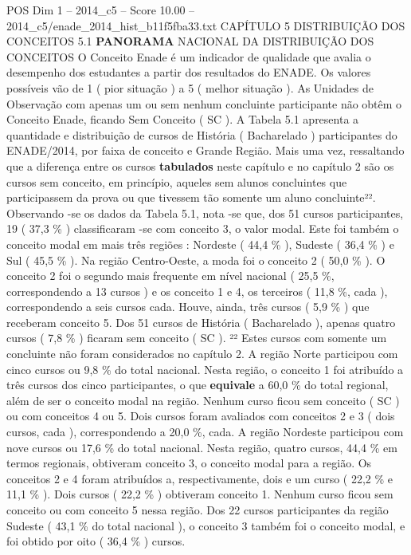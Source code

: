 \begin{textsample}{POS Dim 1 – 2014\_c5 – Score 10.00 – 2014\_c5/enade\_2014\_hist\_b11f5fba33.txt}  \label{ex:f1_pos_105}
CAPÍTULO 5 DISTRIBUIÇÃO DOS CONCEITOS 5.1 \textbf{PANORAMA} NACIONAL DA DISTRIBUIÇÃO DOS CONCEITOS O Conceito Enade é um indicador de qualidade que avalia o desempenho dos estudantes a partir dos resultados do ENADE.
Os valores possíveis vão de 1 ( pior situação ) a 5 ( melhor situação ).
As Unidades de Observação com apenas um ou sem nenhum concluinte participante não obtêm o Conceito Enade, ficando Sem Conceito ( SC ).
A Tabela 5.1 apresenta a quantidade e distribuição de cursos de História ( Bacharelado ) participantes do ENADE/2014, por faixa de conceito e Grande Região.
Mais uma vez, ressaltando que a diferença entre os cursos \textbf{tabulados} neste capítulo e no capítulo 2 são os cursos sem conceito, em princípio, aqueles sem alunos concluintes que participassem da prova ou que tivessem tão somente um aluno concluinte²².
Observando -se os dados da Tabela 5.1, nota -se que, dos 51 cursos participantes, 19 ( 37,3 \% ) classificaram -se com conceito 3, o valor modal.
Este foi também o conceito modal em mais três regiões : Nordeste ( 44,4 \% ), Sudeste ( 36,4 \% ) e Sul ( 45,5 \% ).
Na região Centro-Oeste, a moda foi o conceito 2 ( 50,0 \% ).
O conceito 2 foi o segundo mais frequente em nível nacional ( 25,5 \%, correspondendo a 13 cursos ) e os conceito 1 e 4, os terceiros ( 11,8 \%, cada ), correspondendo a seis cursos cada.
Houve, ainda, três cursos ( 5,9 \% ) que receberam conceito 5.
Dos 51 cursos de História ( Bacharelado ), apenas quatro cursos ( 7,8 \% ) ficaram sem conceito ( SC ). ²² Estes cursos com somente um concluinte não foram considerados no capítulo 2.
A região Norte participou com cinco cursos ou 9,8 \% do total nacional.
Nesta região, o conceito 1 foi atribuído a três cursos dos cinco participantes, o que \textbf{equivale} a 60,0 \% do total regional, além de ser o conceito modal na região.
Nenhum curso ficou sem conceito ( SC ) ou com conceitos 4 ou 5.
Dois cursos foram avaliados com conceitos 2 e 3 ( dois cursos, cada ), correspondendo a 20,0 \%, cada.
A região Nordeste participou com nove cursos ou 17,6 \% do total nacional.
Nesta região, quatro cursos, 44,4 \% em termos regionais, obtiveram conceito 3, o conceito modal para a região.
Os conceitos 2 e 4 foram atribuídos a, respectivamente, dois e um curso ( 22,2 \% e 11,1 \% ).
Dois cursos ( 22,2 \% ) obtiveram conceito 1.
Nenhum curso ficou sem conceito ou com conceito 5 nessa região.
Dos 22 cursos participantes da região Sudeste ( 43,1 \% do total nacional ), o conceito 3 também foi o conceito modal, e foi obtido por oito ( 36,4 \% ) cursos.

\end{textsample}
